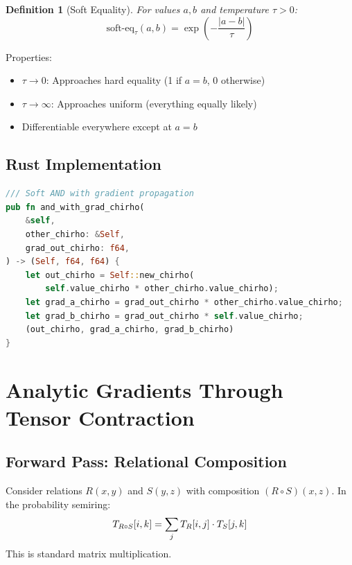 \documentclass[11pt,a4paper]{article}
\newtheorem{definition}[theorem]{Definition}
\begin{document}
\begin{definition}[Soft Equality]
\label{def:soft_eq_chirho}
For values $a, b$ and temperature $\tau > 0$:
\[
\text{soft-eq}_\tau(a, b) = \exp\left(-\frac{|a - b|}{\tau}\right)
\]
\end{definition}

Properties:
\begin{itemize}
  \item $\tau \to 0$: Approaches hard equality (1 if $a = b$, 0 otherwise)
  \item $\tau \to \infty$: Approaches uniform (everything equally likely)
  \item Differentiable everywhere except at $a = b$
\end{itemize}

\subsection{Rust Implementation}
\label{subsec:rust_impl_chirho}

\begin{lstlisting}[language=Rust,caption={Soft AND with gradient (diff\_semiring\_chirho.rs)}]
/// Soft AND with gradient propagation
pub fn and_with_grad_chirho(
    &self,
    other_chirho: &Self,
    grad_out_chirho: f64,
) -> (Self, f64, f64) {
    let out_chirho = Self::new_chirho(
        self.value_chirho * other_chirho.value_chirho);
    let grad_a_chirho = grad_out_chirho * other_chirho.value_chirho;
    let grad_b_chirho = grad_out_chirho * self.value_chirho;
    (out_chirho, grad_a_chirho, grad_b_chirho)
}
\end{lstlisting}

\section{Analytic Gradients Through Tensor Contraction}
\label{sec:gradients_chirho}

\subsection{Forward Pass: Relational Composition}
\label{subsec:forward_chirho}

Consider relations $R(x, y)$ and $S(y, z)$ with composition $(R \circ S)(x, z)$.
In the probability semiring:
\[
T_{R \circ S}[i, k] = \sum_j T_{R}[i, j] \cdot T_{S}[j, k]
\]
This is standard matrix multiplication.
\end{document}

